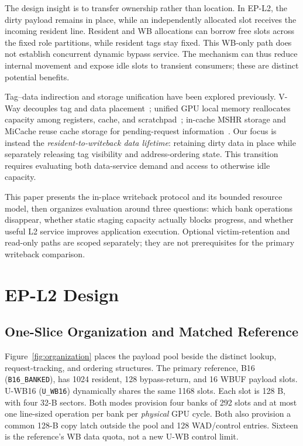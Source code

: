 \documentclass[conference,letterpaper]{IEEEtran}
\newcommand{\epl}{EP-L2}
\newcommand{\base}{B16}
\newcommand{\unif}{U-WB16}
\begin{document}
The design insight is to transfer ownership rather than location. In \epl{}, the dirty payload remains in place, while an independently allocated slot receives the incoming resident line. Resident and WB allocations can borrow free slots across the fixed role partitions, while resident tags stay fixed. This WB-only path does not establish concurrent dynamic bypass service. The mechanism can thus reduce internal movement and expose idle slots to transient consumers; these are distinct potential benefits.

Tag--data indirection and storage unification have been explored previously. V-Way decouples tag and data placement~\cite{vway}; unified GPU local memory reallocates capacity among registers, cache, and scratchpad~\cite{unified}; in-cache MSHR storage and MiCache reuse cache storage for pending-request information~\cite{farkas,micache}. Our focus is instead the \emph{resident-to-writeback data lifetime}: retaining dirty data in place while separately releasing tag visibility and address-ordering state. This transition requires evaluating both data-service demand and access to otherwise idle capacity.

This paper presents the in-place writeback protocol and its bounded resource model, then organizes evaluation around three questions: which bank operations disappear, whether static staging capacity actually blocks progress, and whether useful L2 service improves application execution. Optional victim-retention and read-only paths are scoped separately; they are not prerequisites for the primary writeback comparison.

\section{EP-L2 Design}
\subsection{One-Slice Organization and Matched Reference}
Figure~\ref{fig:organization} places the payload pool beside the distinct lookup, request-tracking, and ordering structures. The primary reference, \base{} (\texttt{B16\_BANKED}), has 1024 resident, 128 bypass-return, and 16 WBUF payload slots. \unif{} (\texttt{U\_WB16}) dynamically shares the same 1168 slots. Each slot is 128 B, with four 32-B sectors. Both modes provision four banks of 292 slots and at most one line-sized operation per bank per \emph{physical} GPU cycle. Both also provision a common 128-B copy latch outside the pool and 128 WAD/control entries. Sixteen is the reference's WB data quota, not a new U-WB control limit.
\end{document}
